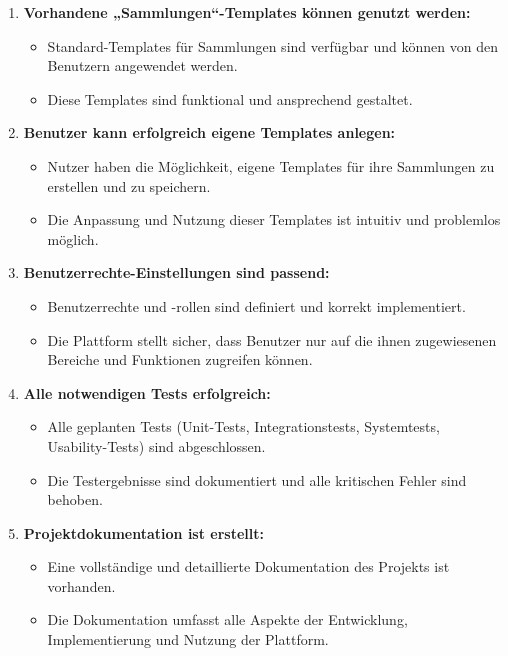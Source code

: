 \begin{enumerate}
    \item \textbf{Vorhandene „Sammlungen“-Templates können genutzt werden:}
    \begin{itemize}[label=--, itemsep=0pt, parsep=0pt]
        \item Standard-Templates für Sammlungen sind verfügbar und können von den Benutzern angewendet werden.
        \item Diese Templates sind funktional und ansprechend gestaltet.
    \end{itemize}

    \item \textbf{Benutzer kann erfolgreich eigene Templates anlegen:}
    \begin{itemize}[label=--, itemsep=0pt, parsep=0pt]
        \item Nutzer haben die Möglichkeit, eigene Templates für ihre Sammlungen zu erstellen und zu speichern.
        \item Die Anpassung und Nutzung dieser Templates ist intuitiv und problemlos möglich.
    \end{itemize}

    \item \textbf{Benutzerrechte-Einstellungen sind passend:}
    \begin{itemize}[label=--, itemsep=0pt, parsep=0pt]
        \item Benutzerrechte und -rollen sind definiert und korrekt implementiert.
        \item Die Plattform stellt sicher, dass Benutzer nur auf die ihnen zugewiesenen Bereiche und Funktionen zugreifen können.
    \end{itemize}

    \item \textbf{Alle notwendigen Tests erfolgreich:}
    \begin{itemize}[label=--, itemsep=0pt, parsep=0pt]
        \item Alle geplanten Tests (Unit-Tests, Integrationstests, Systemtests, Usability-Tests) sind abgeschlossen.
        \item Die Testergebnisse sind dokumentiert und alle kritischen Fehler sind behoben.
    \end{itemize}

    \item \textbf{Projektdokumentation ist erstellt:}
    \begin{itemize}[label=--, itemsep=0pt, parsep=0pt]
        \item Eine vollständige und detaillierte Dokumentation des Projekts ist vorhanden.
        \item Die Dokumentation umfasst alle Aspekte der Entwicklung, Implementierung und Nutzung der Plattform.
    \end{itemize}


\end{enumerate}
